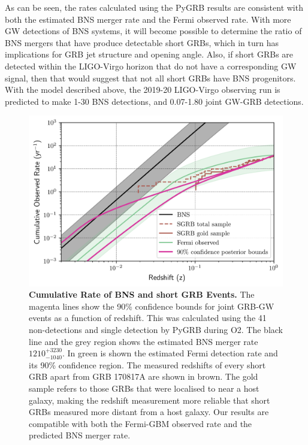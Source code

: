 \documentclass[11pt]{cuthesis}
\begin{document}
As can be seen, the rates calculated using the PyGRB results are consistent with both the estimated BNS merger rate and the Fermi observed rate. With more GW detections of BNS systems, it will become possible to determine the ratio of BNS mergers that have produce detectable short GRBs, which in turn has implications for GRB jet structure and opening angle. Also, if short GRBs are detected within the LIGO-Virgo horizon that do not have a corresponding GW signal, then that would suggest that not all short GRBs have BNS progenitors. With the model described above, the 2019-20 LIGO-Virgo observing run is predicted to make 1-30 BNS detections, and 0.07-1.80 joint GW-GRB detections\cite{o2grb}.
\begin{figure}
\begin{center}
\includegraphics[width=0.9\linewidth]{cumulative_rate.png}
\end{center}
\caption{\textbf{Cumulative Rate of BNS and short GRB Events.} The magenta lines show the 90\% confidence bounds for joint GRB-GW events as a function of redshift. This was calculated using the 41 non-detections and single detection by PyGRB during O2. The black line and the grey region shows the estimated BNS  merger rate $1210^{+3230}_{-1040}$. In green is shown the estimated Fermi detection rate and its 90\% confidence region\cite{Howell}. The measured redshifts of every short GRB apart from GRB 170817A are shown in brown. The gold sample refers to those GRBs that were localised to near a host galaxy, making the redshift measurement more reliable that short GRBs measured more distant from a host galaxy. Our results are compatible with both the Fermi-GBM observed rate and the predicted BNS merger rate.\cite{o2grb}}
\label{fig:cum rate}
\end{figure}
\end{document}

